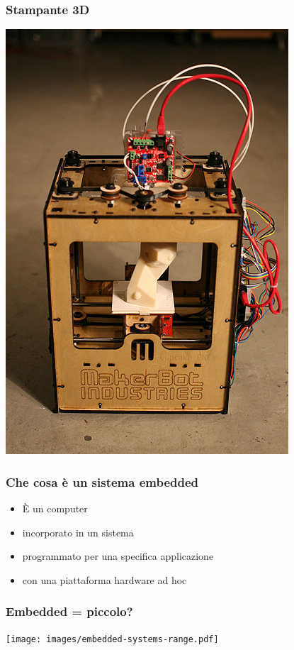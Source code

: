 \documentclass[xetex,table]{beamer}
\begin{document}
\begin{frame}
\frametitle{Stampante 3D}
  \begin{center}
    \includegraphics[height=0.8\textheight]{images/3d-printer.jpg}
  \end{center}
\end{frame}

\begin{frame}
  \frametitle{Che cosa è un sistema embedded}
  \begin{itemize}
    \item È un computer
    \item {\color{red} incorporato} in un sistema
    \item programmato per {\color{blue} una specifica applicazione}
    \item con una piattaforma {\color[rgb]{0,0.5,0} hardware ad hoc}
  \end{itemize}
\end{frame}

\begin{frame}
\frametitle{Embedded = piccolo?}
  \begin{center}
    \texttt{[image: images/embedded-systems-range.pdf]}
  \end{center}
\end{frame}
\end{document}
